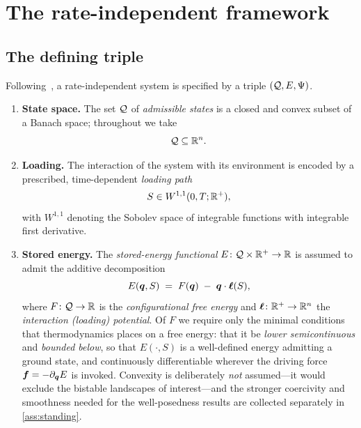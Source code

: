 \section{The rate-independent framework}\label{sec:framework}

\subsection{The defining triple}\label{sec:ingredients}

Following~\cite{MielkeRoubicek}, a rate-independent system is specified
by a triple $(\mathcal{Q}, E, \Psi)$.

\begin{enumerate}[label=(\roman*),leftmargin=2.2em,itemsep=3pt]
  \item \textbf{State space.} The set $\mathcal{Q}$ of \emph{admissible states} is a
  closed and convex subset of a Banach space; throughout we take
  \begin{equation}\label{eq:state_space}
    \mathcal{Q} \subseteq \mathbb{R}^n .
  \end{equation}

  \item \textbf{Loading.} The interaction of the system with its
  environment is encoded by a prescribed, time-dependent
  \emph{loading path}
  \begin{equation}
    S \in W^{1,1}(0,T;\mathbb{R}^{+}),
  \end{equation}
  with $W^{1,1}$ denoting the Sobolev space of integrable functions
  with integrable first derivative.
  
  \item \textbf{Stored energy.} The \emph{stored-energy functional}
  $E\colon \mathcal{Q}\times\mathbb{R}^{+}\to\mathbb{R}$ is assumed to admit the additive
  decomposition
  \begin{equation}\label{eq:energy}
    E(\bm{q}, S) \;=\; F(\bm{q})\;-\;\bm{q}\cdot\bm{\ell}(S),
  \end{equation}
  where $F\colon\mathcal{Q}\to\mathbb{R}$ is the \emph{configurational free energy} and
  $\bm{\ell}\colon\mathbb{R}^{+}\to\mathbb{R}^n$ the \emph{interaction (loading)
  potential}. Of $F$ we require only the minimal conditions that
  thermodynamics places on a free energy: that it be \emph{lower
  semicontinuous} and \emph{bounded below}, so that $E(\cdot,S)$ is a
  well-defined energy admitting a ground state, and continuously
  differentiable wherever the driving force $\bm{f}=-\partial_{\bm{q}}E$
  is invoked. Convexity is deliberately \emph{not} assumed---it would
  exclude the bistable landscapes of interest---and the stronger
  coercivity and smoothness needed for the well-posedness results are
  collected separately in \cref{ass:standing}.


\end{enumerate}
